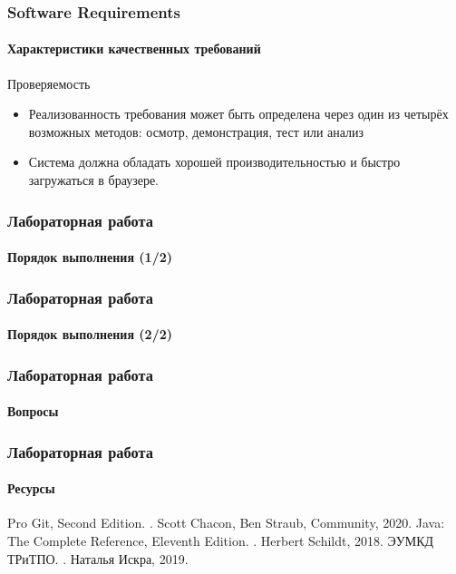 \documentclass[aspectratio=169, 12pt]{beamer}
\begin{document}
\begin{frame}[t]
    \frametitle{Software Requirements}
    \framesubtitle{Характеристики качественных требований}
    Проверяемость \newline
    \begin{itemize}
        \item Реализованность требования может быть определена через один из четырёх возможных методов:
              осмотр, демонстрация, тест или анализ \newline \pause
        \item Система должна обладать хорошей производительностью и быстро загружаться в браузере.
    \end{itemize}
\end{frame}

\begin{frame}[t]
    \frametitle{Лабораторная работа }
    \framesubtitle{Порядок выполнения (1/2)} \pause
\end{frame}

\begin{frame}[t]
    \frametitle{Лабораторная работа }
    \framesubtitle{Порядок выполнения (2/2)}
\end{frame}

\begin{frame}[t]
    \frametitle{Лабораторная работа }
    \framesubtitle{Вопросы} \pause
\end{frame}

\begin{frame}[t]
    \frametitle{Лабораторная работа }
    \framesubtitle{Ресурсы}
    \begin{thebibliography}{10}
        \beamertemplatebookbibitems
        Pro Git, Second Edition.
        .
        \newblock Scott Chacon, Ben Straub, Community, 2020.
        Java: The Complete Reference, Eleventh Edition.
        .
        \newblock Herbert Schildt, 2018.
        ЭУМКД ТРиТПО.
        .
        \newblock Наталья Искра, 2019.
    \end{thebibliography}
\end{frame}
\end{document}
